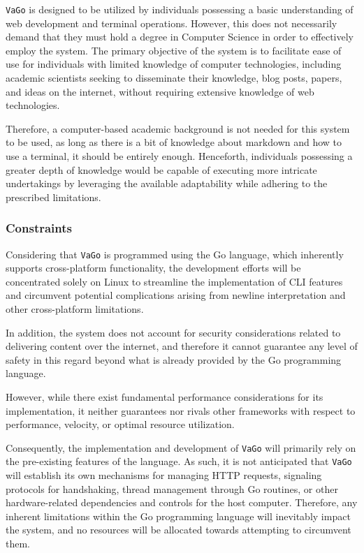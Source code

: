 \texttt{VaGo} is designed to be utilized by individuals possessing a
basic understanding of web development and terminal operations. However,
this does not necessarily demand that they must hold a degree in
Computer Science in order to effectively employ the system. The primary
objective of the system is to facilitate ease of use for individuals
with limited knowledge of computer technologies, including academic
scientists seeking to disseminate their knowledge, blog posts, papers,
and ideas on the internet, without requiring extensive knowledge of web
technologies.

Therefore, a computer-based academic background is not needed for this
system to be used, as long as there is a bit of knowledge about markdown
and how to use a terminal, it should be entirely enough. Henceforth,
individuals possessing a greater depth of knowledge would be capable of
executing more intricate undertakings by leveraging the available
adaptability while adhering to the prescribed limitations.

\subsubsection{Constraints}\label{subsubsec:constraints}

Considering that \texttt{VaGo} is programmed using the Go language,
which inherently supports cross-platform functionality, the development
efforts will be concentrated solely on Linux to streamline the
implementation of CLI features and circumvent potential complications
arising from newline interpretation and other cross-platform
limitations.

In addition, the system does not account for security considerations
related to delivering content over the internet, and therefore it cannot
guarantee any level of safety in this regard beyond what is already
provided by the Go programming language.

However, while there exist fundamental performance considerations for
its implementation, it neither guarantees nor rivals other frameworks
with respect to performance, velocity, or optimal resource utilization.

Consequently, the implementation and development of \texttt{VaGo} will
primarily rely on the pre-existing features of the language. As such, it
is not anticipated that \texttt{VaGo} will establish its own mechanisms
for managing HTTP requests, signaling protocols for handshaking, thread
management through Go routines, or other hardware-related dependencies
and controls for the host computer. Therefore, any inherent limitations
within the Go programming language will inevitably impact the system,
and no resources will be allocated towards attempting to circumvent
them.

